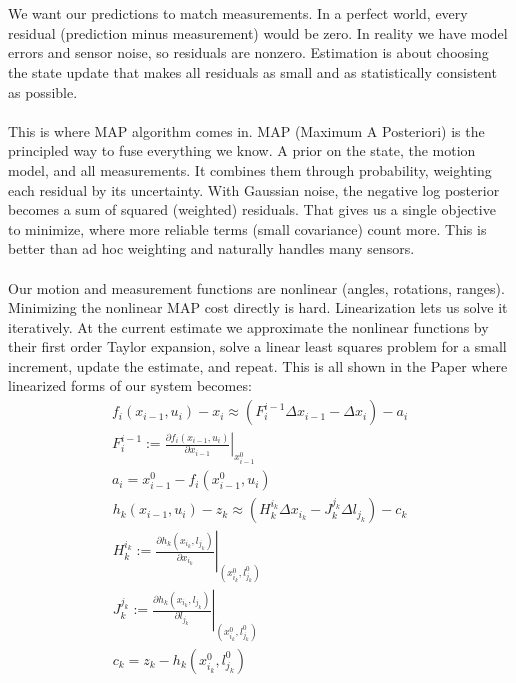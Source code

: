 \\ \\
We want our predictions to match measurements. In a perfect world, every residual (prediction minus measurement) would be zero. In reality we have model errors and sensor noise, so residuals are nonzero. Estimation is about choosing the state update that makes all residuals as small and as statistically consistent as possible.
\\ \\
This is where MAP algorithm comes in. MAP (Maximum A Posteriori) is the principled way to fuse everything we know. A prior on the state, the motion model, and all measurements. It combines them through probability, weighting each residual by its uncertainty. With Gaussian noise, the negative log posterior becomes a sum of squared (weighted) residuals. That gives us a single objective to minimize, where more reliable terms (small covariance) count more. This is better than ad hoc weighting and naturally handles many sensors.
\\ \\
Our motion and measurement functions are nonlinear (angles, rotations, ranges). Minimizing the nonlinear MAP cost directly is hard. Linearization lets us solve it iteratively. At the current estimate we approximate the nonlinear functions by their first order Taylor expansion, solve a linear least squares problem for a small increment, update the estimate, and repeat. This is all shown in the Paper \cite{iSAM_paper} where linearized forms of our system becomes:
\begin{equation}
    \begin{aligned}
        f_{i}(x_{i-1}, u_i) - x_i \approx (F_{i}^{i-1}\Delta x_{i-1} - \Delta x_{i}) - a_i \\
        \left.F_{i}^{i-1} := \frac{\partial f_{i}(x_{i-1}, u_i)}{\partial x_{i-1}}\right|_{x_{i-1}^{0}} \\ 
        a_i = x_{i-1}^{0} - f_{i}(x_{i-1}^{0}, u_i)
    \end{aligned}
    \label{eq:optimizer-iSAM-linearized-odometry}
\end{equation}
\begin{equation}
    \begin{aligned}
        h_{k}(x_{i-1}, u_i) - z_k \approx (H_{k}^{i_k}\Delta x_{i_k} - J_{k}^{j_k} \Delta l_{j_k}) - c_k \\
        \left.H_{k}^{i_k} := \frac{\partial h_{k}(x_{i_k}, l_{j_k})}{\partial x_{i_k}}\right|_{(x_{i_k}^{0}, l_{j_k}^{0})} \\ 
        \left.J_{k}^{j_k} := \frac{\partial h_{k}(x_{i_k}, l_{j_k})}{\partial l_{j_k}}\right|_{(x_{i_k}^{0}, l_{j_k}^{0})} \\ 
        c_k = z_{k} - h_{k}(x_{i_k}^{0}, l_{j_k}^{0})
    \end{aligned}
    \label{eq:optimizer-iSAM-linearized-measurement}
\end{equation}
